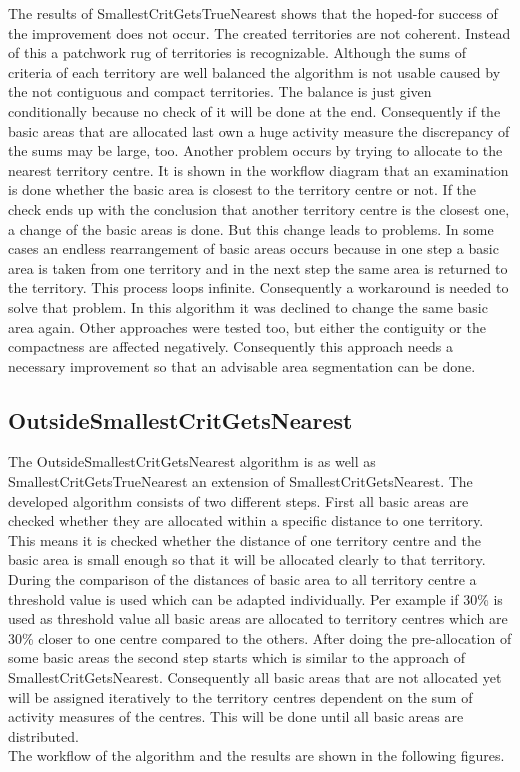 \newpage
The results of SmallestCritGetsTrueNearest shows that the hoped-for success of the improvement does not occur. The created territories are not coherent. Instead of this a patchwork rug of territories is recognizable. Although the sums of criteria of each territory are well balanced the algorithm is not usable caused by the not contiguous and compact territories. The balance is just given conditionally because no check of it will be done at the end. Consequently if the basic areas that are allocated last own a huge activity measure the discrepancy of the sums may be large, too. Another problem occurs by trying to allocate to the nearest territory centre. It is shown in the workflow diagram that an examination is done whether the basic area is closest to the territory centre or not. If the check ends up with the conclusion that another territory centre is the closest one, a change of the basic areas is done. But this change leads to problems. In some cases an endless rearrangement of basic areas occurs because in one step a basic area is taken from one territory and in the next step the same area is returned to the territory. This process loops infinite. Consequently a workaround is needed to solve that problem. In this algorithm it was declined to change the same basic area again. Other approaches were tested too, but either the contiguity or the compactness are affected negatively. Consequently this approach needs a necessary improvement so that an advisable area segmentation can be done.


\subsection{OutsideSmallestCritGetsNearest}

The OutsideSmallestCritGetsNearest algorithm is as well as SmallestCritGetsTrueNearest an extension of SmallestCritGetsNearest. The developed algorithm consists of two different steps. First all basic areas are checked whether they are allocated within a specific distance to one territory. This means it is checked whether the distance of one territory centre and the basic area is small enough so that it will be allocated clearly to that territory. During the comparison of the distances of basic area to all territory centre a threshold value is used which can be adapted individually. Per example if 30\% is used as threshold value all basic areas are allocated to territory centres which are 30\% closer to one centre compared to the others. After doing the pre-allocation of some basic areas the second step starts which is similar to the approach of SmallestCritGetsNearest. Consequently all basic areas that are not allocated yet will be assigned iteratively to the territory centres dependent on the sum of activity measures of the centres. This will be done until all basic areas are distributed.\\
The workflow of the algorithm and the results are shown in the following figures.

